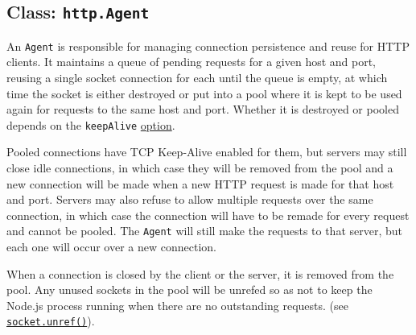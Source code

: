 \begin{Shaded}
\begin{Highlighting}[]
\NormalTok{[ }\OperatorTok{,} \StringTok{\textquotesingle{}123456\textquotesingle{}}\OperatorTok{,}
  \OperatorTok{,} \StringTok{\textquotesingle{}123\textquotesingle{}}\OperatorTok{,}
  \OperatorTok{,} \OperatorTok{,}
  \OperatorTok{,} \OperatorTok{,}
  \OperatorTok{,} \OperatorTok{,}
  \OperatorTok{,} \StringTok{\textquotesingle{}*/*\textquotesingle{}}\NormalTok{ ]}
\end{Highlighting}
\end{Shaded}

\subsection{\texorpdfstring{Class:
\texttt{http.Agent}}{Class: http.Agent}}\label{class-http.agent}

An \texttt{Agent} is responsible for managing connection persistence and
reuse for HTTP clients. It maintains a queue of pending requests for a
given host and port, reusing a single socket connection for each until
the queue is empty, at which time the socket is either destroyed or put
into a pool where it is kept to be used again for requests to the same
host and port. Whether it is destroyed or pooled depends on the
\texttt{keepAlive} \hyperref[new-agentoptions]{option}.

Pooled connections have TCP Keep-Alive enabled for them, but servers may
still close idle connections, in which case they will be removed from
the pool and a new connection will be made when a new HTTP request is
made for that host and port. Servers may also refuse to allow multiple
requests over the same connection, in which case the connection will
have to be remade for every request and cannot be pooled. The
\texttt{Agent} will still make the requests to that server, but each one
will occur over a new connection.

When a connection is closed by the client or the server, it is removed
from the pool. Any unused sockets in the pool will be unrefed so as not
to keep the Node.js process running when there are no outstanding
requests. (see \href{net.md\#socketunref}{\texttt{socket.unref()}}).

